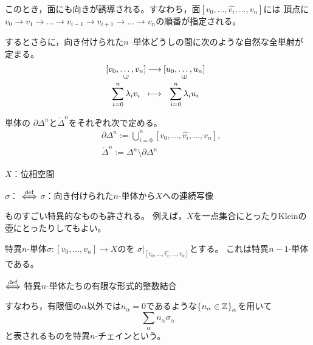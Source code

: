 \documentclass[uplatex]{jsarticle}
\renewcommand{\restriction}[2]{\left. #1 \right|_{#2}}
\begin{document}
このとき，面にも向きが誘導される。すなわち，面$[v_{0}, \dots, \hat{v_{i}}, \dots, v_{n}]$には
頂点に$v_{0} \to v_{1} \to \dots \to v_{i-1} \to v_{i+1} \to \dots \to v_{n}$の順番が指定される。

するとさらに，向き付けられた$n$--単体どうしの間に次のような自然な全単射が定まる。
\begin{equation}
  \mapdef{[v_{0}, \dots, v_{n}]}{[u_{0}, \dots, u_{n}]}{\displaystyle \sum_{i=0}^{n} \lambda_{i} v_{i}}{\displaystyle \sum_{i=0}^{n} \lambda_{i} u_{i}}
\end{equation}

\begin{teigi}[境界，内部]
  単体の $\partial \Delta^{n}$と$\mathring{\Delta}^{n}$をそれぞれ次で定める。
  \begin{align}
    & \partial \Delta^{n} := \bigcup_{i=0}^{n} [v_{0}, \dots, \hat{v_{i}}, \dots, v_{n}], \\
    & \mathring{\Delta}^{n} := \Delta^{n} \setminus \partial \Delta^{n}
  \end{align}
\end{teigi}

\sukima {}

$X$：位相空間

\begin{teigi}[特異$n$-単体]
  $\sigma$： $\overset{\mathrm{def}}{\Longleftrightarrow}$ $\sigma$：向き付けられた$n$-単体から$X$への連続写像
\end{teigi}

ものすごい特異的なものも許される。
例えば，$X$を一点集合にとったりKleinの壺にとったりしてもよい。

\begin{teigi}
  特異$n$-単体$\sigma \colon [v_{0}, \dots, v_{n}] \longrightarrow X$のを
  $\restriction{\sigma}{[v_{0}, \dots,\hat{v_{i}}, \dots, v_{n}]}$とする。
  これは特異$n-1$-単体である。
\end{teigi}

\begin{teigi}[特異$n$-チェイン]
   $\overset{\mathrm{def}}{\Longleftrightarrow}$ 特異$n$-単体たちの有限な形式的整数結合
\end{teigi}

すなわち，有限個の$\alpha$以外では$n_{\alpha}=0$であるような$\Set{\hspace{-1.8pt} n_{\alpha} \in \mathbb{Z} \hspace{-1.8pt}}_{\alpha}$を用いて
\begin{equation}
  \sum_{\alpha} n_{\alpha} \sigma_{\alpha}
\end{equation}
と表されるものを特異$n$-チェインという。
\end{document}
